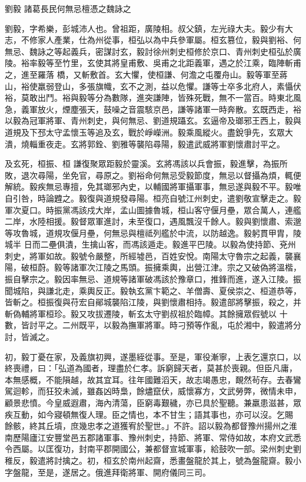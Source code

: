 
\begin{pinyinscope}
劉毅
 諸葛長民何無忌檀憑之魏詠之



 劉毅，字希樂，彭城沛人也。曾祖距，廣陵相。叔父鎮，左光祿大夫。毅少有大志，不修家人產業，仕為州從事，桓弘以為中兵參軍屬。桓玄篡位，毅與劉裕、何無忌、魏詠之等起義兵，密謀討玄，毅討徐州刺史桓修於京口、青州刺史桓弘於廣陵。裕率毅等至竹里，玄使其將皇甫敷、吳甫之北距義軍，遇之於江乘，臨陣斬甫之，進至羅落
 橋，又斬敷首。玄大懼，使桓謙、何澹之屯覆舟山。毅等軍至蔣山，裕使羸弱登山，多張旗幟，玄不之測，益以危懼。謙等士卒多北府人，素懾伏裕，莫敢出鬥。裕與毅等分為數隊，進突謙陣，皆殊死戰，無不一當百。時東北風急，義軍放火，煙塵張天，鼓噪之音震駭京邑，謙等諸軍一時奔散。玄既西走，裕以毅為冠軍將軍、青州刺史，與何無忌、劉道規躡玄。玄逼帝及瑯邪王西上，毅與道規及下邳太守孟懷玉等追及玄，戰於崢嶸洲。毅乘風縱火。盡銳爭先，玄眾大潰，燒輜重夜走。玄將郭銓、劉雅等襲陷尋陽，毅遣武威將軍劉懷肅討平之。



 及玄死，桓振、桓
 謙復聚眾距毅於靈溪。玄將馮該以兵會振，毅進擊，為振所敗，退次尋陽，坐免官，尋原之。劉裕命何無忌受毅節度，無忌以督攝為煩，輒便解統。毅疾無忌專擅，免其瑯邪內史，以輔國將軍攝軍事，無忌遂與毅不平。毅唯自引咎，時論韙之。毅復與道規發尋陽。桓亮自號江州刺史，遣劉敬宣擊走之。毅軍次夏口。時振黨馮該戍大岸，孟山圖據魯城，桓山客守偃月壘，眾合萬人，連艦二岸，水陸相援。毅督眾軍進討，未至復口，遇風飄沒千餘人。毅與劉懷肅、索邈等攻魯城，道規攻偃月壘，何無忌與檀祗列艦於中流，以防越逸。毅躬貫甲胄，陵城半
 日而二壘俱潰，生擒山客，而馮該遁走。毅進平巴陵。以毅為使持節、兗州刺史，將軍如故。毅號令嚴整，所經墟邑，百姓安悅。南陽太守魯宗之起義，襲襄陽，破桓蔚。毅等諸軍次江陵之馬頭。振擁乘輿，出營江津。宗之又破偽將溫楷，振自擊宗之。毅因率無忌、道規等諸軍破馮該於豫章口，推鋒而進，遂入江陵。振聞城陷，與謙北走，乘輿反正。毅執玄黨卞範之、羊僧壽、夏侯崇之、桓道恭等，皆斬之。桓振復與苻宏自鄖城襲陷江陵，與劉懷肅相持。毅遣部將擊振，殺之，并斬偽輔將軍桓珍。毅又攻拔遷陵，斬玄太守劉叔祖於臨幛。其餘擁眾假號以
 十數，皆討平之。二州既平，以毅為撫軍將軍。時刁預等作亂，屯於湘中，毅遣將分討，皆滅之。



 初，毅丁憂在家，及義旗初興，遂墨絰從事。至是，軍役漸寧，上表乞還京口，以終喪禮，曰：「弘道為國者，理盡於仁孝。訴窮歸天者，莫甚於喪親。但臣凡庸，本無感概，不能隕越，故其宜耳。往年國難滔天，故志竭愚忠，靦然茍存。去春鸞駕迴軫，而狂狡未滅，雖姦凶時梟，餘燼竄伏，威懷寡方，文武勞弊，微情未申，顧景悲憤。今皇威遐肅，海內清蕩，臣窮毒艱穢，亦已具於聖聽。兼羸患滋甚，眾疾互動，如今寢頓無復人理。臣之情也，本不甘生；語其事也，亦可以沒。乞賜
 餘骸，終其丘墳，庶幾忠孝之道獲宥於聖世。」不許。詔以毅為都督豫州揚州之淮南歷陽廬江安豐堂邑五郡諸軍事、豫州刺史，持節、將軍、常侍如故，本府文武悉令西屬。以匡復功，封南平郡開國公，兼都督宣城軍事，給鼓吹一部。梁州刺史劉稚反，毅遣將討擒之。初，桓玄於南州起齋，悉畫盤龍於其上，號為盤龍齋。毅小字盤龍，至是，遂居之。俄進拜衛將軍、開府儀同三司。




\end{pinyinscope}
